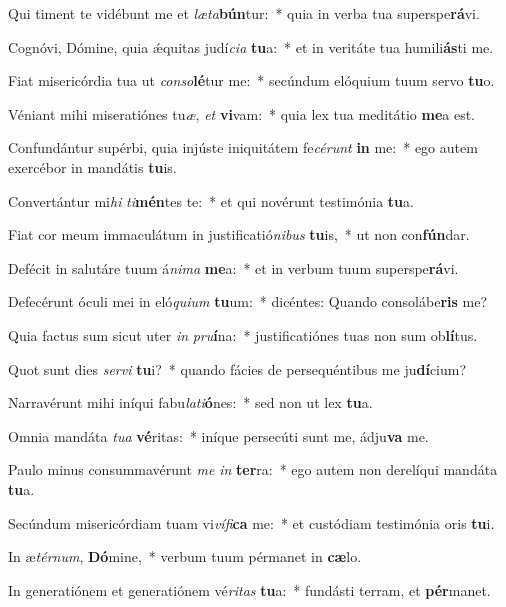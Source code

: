 \item Qui timent te vidébunt me et \textit{læ}\textit{ta}\textbf{bún}tur:~* quia in verba tua superspe\textbf{rá}vi.
\item Cognóvi, Dómine, quia ǽquitas judí\textit{ci}\textit{a} \textbf{tu}a:~* et in veritáte tua humili\textbf{ás}ti me.
\item Fiat misericórdia tua ut \textit{con}\textit{so}\textbf{lé}tur me:~* secúndum elóquium tuum servo \textbf{tu}o.
\item Véniant mihi miseratiónes tu\textit{æ}, \textit{et} \textbf{vi}vam:~* quia lex tua meditátio \textbf{me}a est.
\item Confundántur supérbi, quia injúste iniquitátem fe\textit{cé}\textit{runt} \textbf{in} me:~* ego autem exercébor in mandátis \textbf{tu}is.
\item Convertántur mi\textit{hi} \textit{ti}\textbf{mén}tes te:~* et qui novérunt testimónia \textbf{tu}a.
\item Fiat cor meum immaculátum in justificatió\textit{ni}\textit{bus} \textbf{tu}is,~* ut non con\textbf{fún}dar.
\item Defécit in salutáre tuum á\textit{ni}\textit{ma} \textbf{me}a:~* et in verbum tuum superspe\textbf{rá}vi.
\item Defecérunt óculi mei in eló\textit{qui}\textit{um} \textbf{tu}um:~* dicéntes: Quando consolábe\textbf{ris} me?
\item Quia factus sum sicut uter \textit{in} \textit{pru}\textbf{í}na:~* justificatiónes tuas non sum ob\textbf{lí}tus.
\item Quot sunt dies \textit{ser}\textit{vi} \textbf{tu}i?~* quando fácies de persequéntibus me ju\textbf{dí}cium?
\item Narravérunt mihi iníqui fabu\textit{la}\textit{ti}\textbf{ó}nes:~* sed non ut lex \textbf{tu}a.
\item Omnia mandáta \textit{tu}\textit{a} \textbf{vé}ritas:~* iníque persecúti sunt me, ádju\textbf{va} me.
\item Paulo minus consummavérunt \textit{me} \textit{in} \textbf{ter}ra:~* ego autem non derelíqui mandáta \textbf{tu}a.
\item Secúndum misericórdiam tuam vi\textit{ví}\textit{fi}\textbf{ca} me:~* et custódiam testimónia oris \textbf{tu}i.
\item In æ\textit{tér}\textit{num}, \textbf{Dó}mine,~* verbum tuum pérmanet in \textbf{cæ}lo.
\item In generatiónem et generatiónem vé\textit{ri}\textit{tas} \textbf{tu}a:~* fundásti terram, et \textbf{pér}manet.
